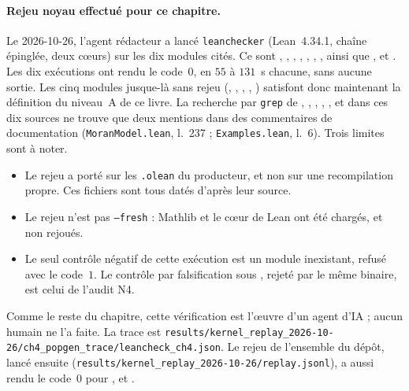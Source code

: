\paragraph{Rejeu noyau effectué pour ce chapitre.}
Le 2026-10-26, l'agent rédacteur a lancé \texttt{leanchecker} (Lean~4.34.1, chaîne épinglée, deux
cœurs) sur les dix modules cités. Ce sont , ,
, , , ,
, ainsi que ,  et . Les dix
exécutions ont rendu le code~$0$, en $55$ à $131$~s chacune, sans aucune sortie. Les cinq modules jusque-là sans rejeu
(, , , , ) satisfont donc maintenant la
définition du niveau~A de ce livre. La recherche par \texttt{grep} de , ,
, , ,  et  dans ces dix sources ne
trouve que deux mentions dans des commentaires de documentation (\texttt{MoranModel.lean}, l.~237 ;
\texttt{Examples.lean}, l.~6). Trois limites sont à noter.
\begin{itemize}[itemsep=1pt]
\item Le rejeu a porté sur les \texttt{.olean} du producteur, et non sur une recompilation propre. Ces fichiers
sont tous datés d'après leur source.
\item Le rejeu n'est pas \texttt{--fresh} : Mathlib et le cœur de Lean ont été chargés, et non rejoués.
\item Le seul contrôle négatif de cette exécution est un module inexistant, refusé avec le code~$1$. Le contrôle
par falsification sous , rejeté par le même binaire, est celui de l'audit N4.
\end{itemize}
Comme le reste du chapitre, cette vérification est l'œuvre d'un agent d'IA ; aucun humain ne l'a faite. La
trace est \texttt{results/kernel\_replay\_2026-10-26/ch4\_popgen\_trace/leancheck\_ch4.json}. Le rejeu de l'ensemble du dépôt, lancé ensuite
(\texttt{results/kernel\_replay\_2026-10-26/replay.jsonl}), a aussi rendu le code~$0$ pour , 
et .

